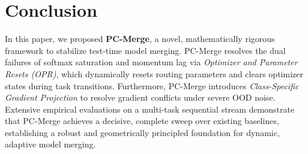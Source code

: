 \documentclass{article}
\theoremstyle{plain}
\theoremstyle{definition}
\theoremstyle{remark}
\begin{document}
\section{Conclusion}
\label{sec:conclusion}
In this paper, we proposed \textbf{PC-Merge}, a novel, mathematically rigorous framework to stabilize test-time model merging. PC-Merge resolves the dual failures of softmax saturation and momentum lag via \emph{Optimizer and Parameter Resets (OPR)}, which dynamically resets routing parameters and clears optimizer states during task transitions. Furthermore, PC-Merge introduces \emph{Class-Specific Gradient Projection} to resolve gradient conflicts under severe OOD noise. Extensive empirical evaluations on a multi-task sequential stream demonstrate that PC-Merge achieves a decisive, complete sweep over existing baselines, establishing a robust and geometrically principled foundation for dynamic, adaptive model merging.



\end{document}
